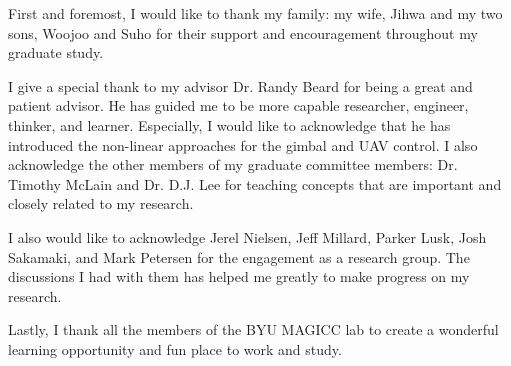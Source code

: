 \afterpage{\cleardoublepage}
%
First and foremost, I would like to thank my family: my wife, Jihwa and my two sons, Woojoo and Suho for their support and encouragement throughout my graduate study.

I give a special thank to my advisor Dr. Randy Beard for being a great and patient advisor. He has guided me to be more capable researcher, engineer, thinker, and learner. Especially, I would like to acknowledge that he has introduced the non-linear approaches for the gimbal and UAV control. I also acknowledge the other members of my graduate committee members: Dr. Timothy McLain and Dr. D.J. Lee for teaching concepts that are important and closely related to my research.

I also would like to acknowledge Jerel Nielsen, Jeff Millard, Parker Lusk, Josh Sakamaki, and Mark Petersen for the engagement as a research group. The discussions I had with them has helped me greatly to make progress on my research.

Lastly, I thank all the members of the BYU MAGICC lab to create a wonderful learning opportunity and fun place to work and study.
